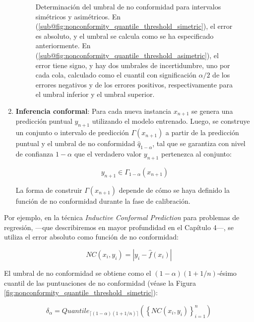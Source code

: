\begin{enumerate}
\begin{figure}[htbp]
        \caption[
            Determinación del umbral de no conformidad para intervalos simétricos y asimétricos.
        ]{
            Determinación del umbral de no conformidad para intervalos simétricos y asimétricos. 
            En (\ref{sub@fig:nonconformity_quantile_threshold_simetric}), el error es absoluto, y el umbral
            se calcula como se ha especificado anteriormente. 
            En (\ref{sub@fig:nonconformity_quantile_threshold_asimetric}), el error tiene signo, y hay dos
            umbrales de incertidumbre, uno por cada cola, calculado como el cuantil con significación
            $\alpha/2$ de los errores negativos y de los errores positivos, respectivamente para el umbral
            inferior y el umbral superior. 
        }
        \label{fig:nonconformity_quantile_comparison}
    \end{figure}


    \item \textbf{Inferencia conformal}: Para cada nueva instancia $x_{n+1}$ se genera una predicción puntual
    $y_{n+1}$ utilizando el modelo entrenado. Luego, se construye un conjunto o intervalo de predicción
    $\Gamma(x_{n+1})$ a partir de la predicción puntual y el umbral de no conformidad $\hat{q}_{1-\alpha}$, 
    tal que se garantiza con nivel de confianza $1-\alpha$ que el verdadero valor $y_{n+1}$ pertenezca al
    conjunto:
    
    $$
    y_{n+1} \in \Gamma_{1-\alpha}(x_{n+1})
    $$

    La forma de construir $\Gamma(x_{n+1})$ depende de cómo se haya definido la función de no conformidad 
    durante la fase de calibración.

\end{enumerate}




Por ejemplo, en la técnica \textit{Inductive Conformal Prediction} \cite{papadopoulos2002} para problemas de regresión, ---que describiremos en mayor profundidad en el Capítulo 4---, se utiliza el error absoluto como función de no conformidad:

$$
NC(x_i, y_i) = | y_i - \hat{f}(x_i) |
$$

El umbral de no conformidad se obtiene como el $(1 - \alpha)(1 + 1/n)$-ésimo cuantil de las puntuaciones de no conformidad (véase la Figura \ref{fig:nonconformity_quantile_threshold_simetric}):

$$
\delta_\alpha = Quantile_{ \lceil  (1-\alpha) (1 + 1/n)  \rceil } ( \left\{ NC(x_i,y_i) \right\}_{i=1}^n )
$$

